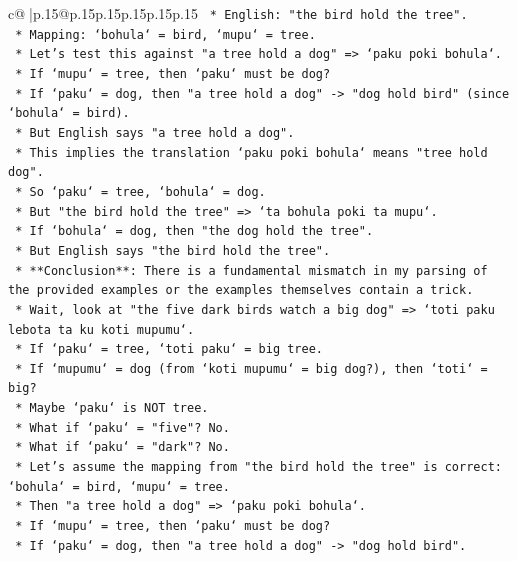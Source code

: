 \documentclass{article}
\begin{document}
{\begin{supertabular}{c@{$\;$}|p{.15\linewidth}@{}p{.15\linewidth}p{.15\linewidth}p{.15\linewidth}p{.15\linewidth}p{.15\linewidth}}
{{{\texttt{        *   English: "the bird hold the tree".} \\
\texttt{        *   Mapping: `bohula` = bird, `mupu` = tree.} \\
\texttt{        *   Let's test this against "a tree hold a dog" => `paku poki bohula`.} \\
\texttt{            *   If `mupu` = tree, then `paku` must be dog?} \\
\texttt{            *   If `paku` = dog, then "a tree hold a dog" {-}> "dog hold bird" (since `bohula` = bird).} \\
\texttt{            *   But English says "a tree hold a dog".} \\
\texttt{            *   This implies the translation `paku poki bohula` means "tree hold dog".} \\
\texttt{            *   So `paku` = tree, `bohula` = dog.} \\
\texttt{            *   But "the bird hold the tree" => `ta bohula poki ta mupu`.} \\
\texttt{            *   If `bohula` = dog, then "the dog hold the tree".} \\
\texttt{            *   But English says "the bird hold the tree".} \\
\texttt{            *   **Conclusion**: There is a fundamental mismatch in my parsing of the provided examples or the examples themselves contain a trick.} \\
\texttt{            *   Wait, look at "the five dark birds watch a big dog" => `toti paku lebota ta ku koti mupumu`.} \\
\texttt{            *   If `paku` = tree, `toti paku` = big tree.} \\
\texttt{            *   If `mupumu` = dog (from `koti mupumu` = big dog?), then `toti` = big?} \\
\texttt{            *   Maybe `paku` is NOT tree.} \\
\texttt{            *   What if `paku` = "five"? No.} \\
\texttt{            *   What if `paku` = "dark"? No.} \\
\texttt{            *   Let's assume the mapping from "the bird hold the tree" is correct: `bohula` = bird, `mupu` = tree.} \\
\texttt{            *   Then "a tree hold a dog" => `paku poki bohula`.} \\
\texttt{                *   If `mupu` = tree, then `paku` must be dog?} \\
\texttt{                *   If `paku` = dog, then "a tree hold a dog" {-}> "dog hold bird".} \\
}}}
\end{supertabular}}
\end{document}
